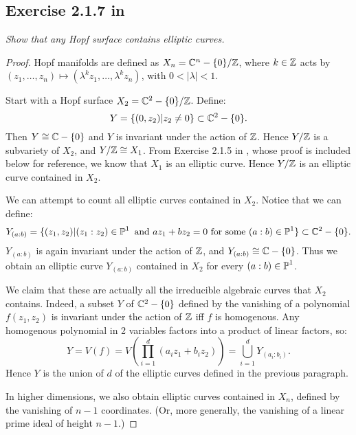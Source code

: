 \documentclass{article}
\begin{document}
\subsection*{Exercise 2.1.7 in \cite{Huy}}
\emph{Show that any Hopf surface contains elliptic curves.}
\begin{proof}
Hopf manifolds are defined as $X_n = \mathbb{C}^n - \{0\} / \mathbb{Z}$, where $k \in \mathbb{Z}$ acts by $(z_1, \dots, z_n) \mapsto
(\lambda^k z_1, \dots, \lambda^k z_n)$, with $0<|\lambda|<1$.

Start with a Hopf surface $X_2 = \mathbb{C}^2 - \{0\} / \mathbb{Z}$. Define:
\[	Y = \{(0, z_2) | z_2 \neq 0\} \subset \mathbb{C}^2 - \{0\}.	\]
Then $Y \cong \mathbb{C} - \{0\}$ and $Y$ is invariant under the action of $\mathbb{Z}$. Hence $Y/\mathbb{Z}$ is a subvariety of
$X_2$, and $Y / \mathbb{Z} \cong X_1$. From Exercise 2.1.5 in \cite{Huy}, whose proof is included below for reference,
we know that $X_1$ is an elliptic curve. Hence $Y/\mathbb{Z}$ is an elliptic curve contained in $X_2$.

We can attempt to count all elliptic curves contained in $X_2$. Notice that we can define:
\[	Y_{(a:b)} = \{(z_1, z_2) | (z_1:z_2) \in \operatorname{\mathbb{P}}^1 \text{ and } az_1 + bz_2 = 0 \text{ for some } (a:b) \in \operatorname{\mathbb{P}}^1\}
\subset \mathbb{C}^2 - \{0\}.	\]
$Y_{(a:b)}$ is again invariant under the action of $\mathbb{Z}$, and $Y_{(a:b)} \cong \mathbb{C}-\{0\}$. Thus we obtain an elliptic curve
$Y_{(a:b)}$ contained in $X_2$ for every $(a:b) \in \operatorname{\mathbb{P}}^1$.

We claim that these are actually all the irreducible algebraic curves that $X_2$ contains. Indeed, 
a subset $Y$ of $\mathbb{C}^2 - \{0\}$
defined by the vanishing of a polynomial $f(z_1, z_2)$ is invariant under the action of $\mathbb{Z}$ iff $f$ is
homogenous. Any homogenous polynomial in 2 variables factors into a product of linear factors, so:
\[	Y = V(f) = V\left(\prod_{i=1}^d (a_i z_1 + b_i z_2) \right)	= \bigcup_{i=1}^d Y_{(a_i:b_i)}. \]
Hence $Y$ is the union of $d$ of the elliptic curves defined in the previous paragraph.

In higher dimensions, we also obtain elliptic curves contained in $X_n$, defined by the vanishing of $n-1$
coordinates. (Or, more generally, the vanishing of a linear prime ideal of height $n-1$.)
\end{proof}
\end{document}

